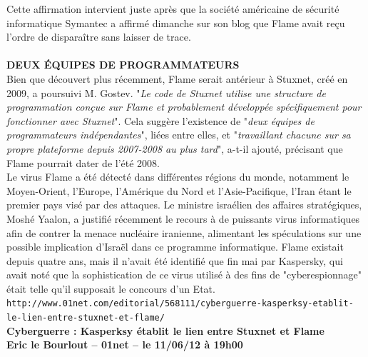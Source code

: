 \documentclass[11pt,twoside,a4paper]{article}
\begin{document}
Cette affirmation intervient juste apr{\`e}s que la soci{\'e}t{\'e} am{\'e}ricaine de s{\'e}curit{\'e} informatique Symantec a affirm{\'e} dimanche sur son blog que Flame avait re\c{c}u l'ordre de dispara{\^i}tre sans laisser de trace.~\\

~\\

\textbf{\large DEUX {\'E}QUIPES DE PROGRAMMATEURS}~\\

Bien que d{\'e}couvert plus r{\'e}cemment, Flame serait ant{\'e}rieur {\`a} Stuxnet, cr{\'e}{\'e} en 2009, a poursuivi M. Gostev. "\emph{Le code de Stuxnet utilise une structure de programmation con\c{c}ue sur Flame et probablement d{\'e}velopp{\'e}e sp{\'e}cifiquement pour fonctionner avec Stuxnet}". Cela sugg{\`e}re l'existence de "\emph{deux {\'e}quipes de programmateurs ind{\'e}pendantes}", li{\'e}es entre elles, et "\emph{travaillant chacune sur sa propre plateforme depuis 2007-2008 au plus tard}", a-t-il ajout{\'e}, pr{\'e}cisant que Flame pourrait dater de l'{\'e}t{\'e} 2008.~\\

Le virus Flame a {\'e}t{\'e} d{\'e}tect{\'e} dans diff{\'e}rentes r{\'e}gions du monde, notamment le Moyen-Orient, l'Europe, l'Am{\'e}rique du Nord et l'Asie-Pacifique, l'Iran {\'e}tant le premier pays vis{\'e} par des attaques. Le ministre isra{\'e}lien des affaires strat{\'e}giques, Mosh{\'e} Yaalon, a justifi{\'e} r{\'e}cemment le recours {\`a} de puissants virus informatiques afin de contrer la menace nucl{\'e}aire iranienne, alimentant les sp{\'e}culations sur une possible implication d'Isra{\"e}l dans ce programme informatique. Flame existait depuis quatre ans, mais il n'avait {\'e}t{\'e} identifi{\'e} que fin mai par Kaspersky, qui avait not{\'e} que la sophistication de ce virus utilis{\'e} {\`a} des fins de "cyberespionnage" {\'e}tait telle qu'il supposait le concours d'un Etat.~\\


\texttt{http://www.01net.com/editorial/568111/cyberguerre-kasperksy-etablit-le-lien-entre-stuxnet-et-flame/}~\\

\textbf{\LARGE Cyberguerre : Kasperksy {\'e}tablit le lien entre Stuxnet et Flame}~\\

\textbf{\small Eric le Bourlout -- 01net -- le 11/06/12 {\`a} 19h00}~\\
\end{document}
